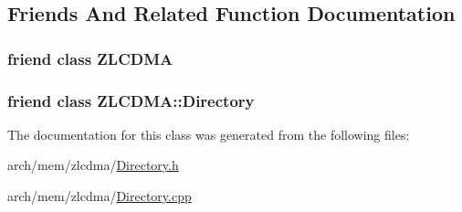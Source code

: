 \subsection{Friends And Related Function Documentation}
\hypertarget{class_simulator_1_1_z_l_c_d_m_a_1_1_directory_top_a1c09861c9a70825235b5f80518d478a1}{
\subsubsection[{Z\+L\+C\+D\+M\+A}]{\setlength{\rightskip}{0pt plus 5cm}friend class {\bf Z\+L\+C\+D\+M\+A}\hspace{0.3cm}{\ttfamily [friend]}}}\label{class_simulator_1_1_z_l_c_d_m_a_1_1_directory_top_a1c09861c9a70825235b5f80518d478a1}
\hypertarget{class_simulator_1_1_z_l_c_d_m_a_1_1_directory_top_a1c8d2b869e248d4ee4a7b637c7252d62}{
\subsubsection[{Z\+L\+C\+D\+M\+A\+::\+Directory}]{\setlength{\rightskip}{0pt plus 5cm}friend class {\bf Z\+L\+C\+D\+M\+A\+::\+Directory}\hspace{0.3cm}{\ttfamily [friend]}}}\label{class_simulator_1_1_z_l_c_d_m_a_1_1_directory_top_a1c8d2b869e248d4ee4a7b637c7252d62}


The documentation for this class was generated from the following files\+:\begin{DoxyCompactItemize}
\item 
arch/mem/zlcdma/\hyperlink{zlcdma_2_directory_8h}{Directory.\+h}\item 
arch/mem/zlcdma/\hyperlink{zlcdma_2_directory_8cpp}{Directory.\+cpp}\end{DoxyCompactItemize}
